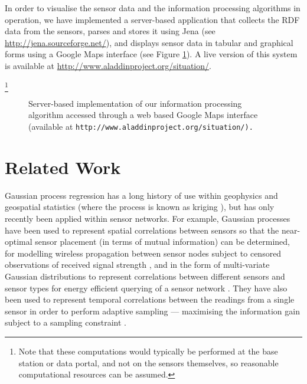 \documentclass{acmtrans2m}
\begin{document}
In order to visualise the sensor data and the information processing algorithms in operation, we have implemented a server-based application that collects the RDF data from the sensors, parses and stores it using Jena (see \url{http://jena.sourceforge.net/}), and displays sensor data in tabular and graphical forms using a Google Maps interface (see Figure \ref{screen}). A live version of this system is available at \url{http://www.aladdinproject.org/situation/}.

\footnote{Note that these computations would typically be performed at the base station or data portal, and not on the sensors themselves, so reasonable computational resources can be assumed.}

\begin{figure}
\begin{center}
\caption{Server-based implementation of our information processing algorithm accessed through a web based Google Maps interface (available at \tt{http://www.aladdinproject.org/situation/}).}
\label{screen}
\end{center}
\end{figure}

\section{Related Work}\label{sec_related}

\noindent Gaussian process regression has a long history of use within geophysics and geospatial statistics (where the process is known as kriging \cite{cressie}), but has only recently been applied within sensor networks. For example, Gaussian processes have been used to represent spatial correlations between sensors so that the near-optimal sensor placement (in terms of mutual information) can be determined, for modelling wireless propagation between sensor nodes subject to censored observations of received signal strength \cite{ertin2007gpm}, and in the form of multi-variate Gaussian distributions to represent correlations between different sensors and sensor types for energy efficient querying of a sensor network \cite{guestrin2}. They have also been used to represent temporal correlations between the readings from a single sensor in order to perform adaptive sampling --- maximising the information gain subject to a sampling constraint \cite{1525857}.
\end{document}
